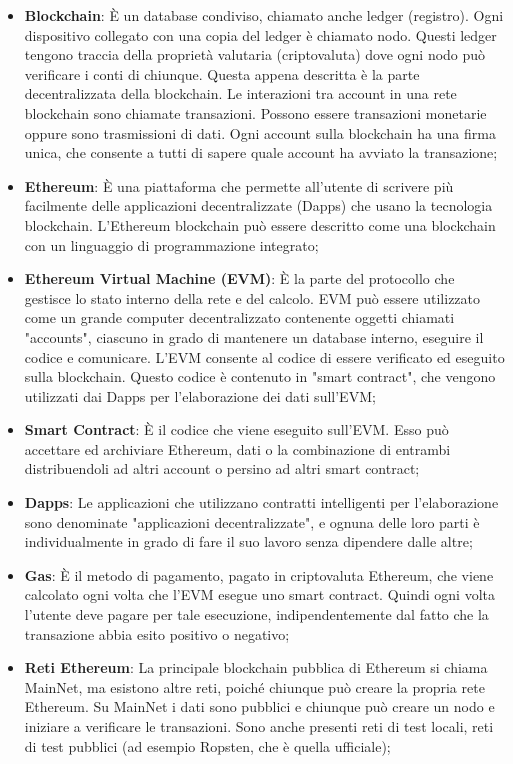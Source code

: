 \begin{itemize}
\item \textbf{Blockchain}: È un database condiviso, chiamato anche ledger (registro). Ogni dispositivo collegato con una copia del ledger è chiamato nodo. Questi ledger tengono traccia della proprietà valutaria (criptovaluta) dove ogni nodo può verificare i conti di chiunque. Questa appena descritta \`e la parte decentralizzata della blockchain. Le interazioni tra account in una rete blockchain sono chiamate transazioni. Possono essere transazioni monetarie oppure sono trasmissioni di dati. Ogni account sulla blockchain ha una firma unica, che consente a tutti di sapere quale account ha avviato la transazione;
\item \textbf{Ethereum}: È una piattaforma che permette all'utente di scrivere più facilmente delle applicazioni decentralizzate (Dapps) che usano la tecnologia blockchain. L'Ethereum blockchain può essere descritto come una blockchain con un linguaggio di programmazione integrato;
\item \textbf{Ethereum Virtual Machine (EVM)}: È la parte del protocollo che gestisce lo stato interno della rete e del calcolo. EVM può essere utilizzato come un grande computer decentralizzato contenente oggetti chiamati "accounts", ciascuno in grado di mantenere un database interno, eseguire il codice e comunicare. L'EVM consente al codice di essere verificato ed eseguito sulla blockchain. Questo codice è contenuto in "smart contract", che vengono utilizzati dai Dapps per l'elaborazione dei dati sull'EVM;
\item \textbf{Smart Contract}: È il codice che viene eseguito sull'EVM. Esso può accettare ed archiviare Ethereum, dati o la combinazione di entrambi distribuendoli ad altri account o persino ad altri smart contract;
\item \textbf{Dapps}: Le applicazioni che utilizzano contratti intelligenti per l'elaborazione sono denominate "applicazioni decentralizzate", e ognuna delle loro parti \`e individualmente in grado di fare il suo lavoro senza dipendere dalle altre;
\item \textbf{Gas}: È il metodo di pagamento, pagato in criptovaluta Ethereum, che viene calcolato ogni volta che l'EVM esegue uno smart contract. Quindi ogni volta l'utente deve pagare per tale esecuzione, indipendentemente dal fatto che la transazione abbia esito positivo o negativo;
\item \textbf{Reti Ethereum}: La principale blockchain pubblica di Ethereum si chiama MainNet, ma esistono altre reti, poiché chiunque può creare la propria rete Ethereum. Su MainNet i dati sono pubblici e chiunque può creare un nodo e iniziare a verificare le transazioni. Sono anche presenti reti di test locali, reti di test pubblici (ad esempio Ropsten, che è quella ufficiale);

\end{itemize}
